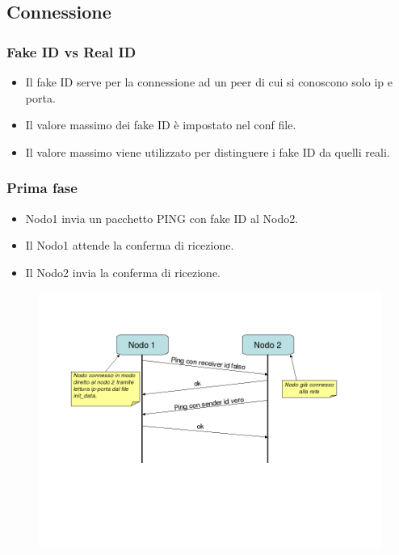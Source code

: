 \documentclass[a4paper,italian,12pt]{beamer}
\begin{document}
		\subsection{Connessione}
			\begin{frame}
				\frametitle{Fake ID vs Real ID}
				\begin{itemize}
					\item Il fake ID serve per la connessione ad un peer di cui si conoscono solo ip e porta.
					\item Il valore massimo dei fake ID è impostato nel conf file.
					\item Il valore massimo viene utilizzato per distinguere i fake ID da quelli reali.
				\end{itemize}
			\end{frame}
			\begin{frame}
				\frametitle{Prima fase}
				\begin{itemize}
					\item Nodo1 invia un pacchetto PING con fake ID al Nodo2.
					\item Il Nodo1 attende la conferma di ricezione.
					\item Il Nodo2 invia la conferma di ricezione.
				\end{itemize}
				\begin{figure}[H]
					\begin{center}
						\includegraphics[scale=0.3]{etc/Bootstrap.png}
					\end{center}
				\end{figure}
			\end{frame}
\end{document}
